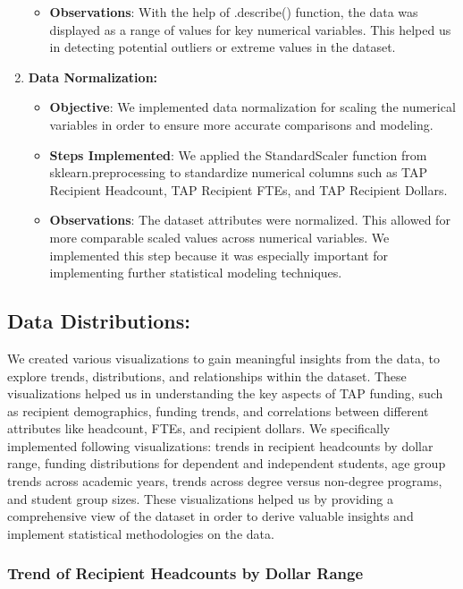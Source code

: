 \documentclass[sigconf]{acmart}
\begin{document}
\begin{enumerate}
\begin{itemize}
        \item \textbf{Observations}: With the help of .describe() function, the data was displayed as a range of values for key numerical variables. This helped us in detecting potential outliers or extreme values in the dataset.
    \end{itemize}
    \item \textbf{Data Normalization:}
    \begin{itemize}
        \item \textbf{Objective}: We implemented data normalization for scaling the numerical variables in order to ensure more accurate comparisons and modeling.
        \item \textbf{Steps Implemented}: We applied the StandardScaler function from sklearn.preprocessing to standardize numerical columns such as TAP Recipient Headcount, TAP Recipient FTEs, and TAP Recipient Dollars.
        \item \textbf{Observations}: The dataset attributes were normalized. This allowed for more comparable scaled values across numerical variables. We implemented this step because it was especially important for implementing further statistical modeling techniques.
    \end{itemize}
\end{enumerate}

\subsection{Data Distributions:}
We created various visualizations to gain meaningful insights from the data, to explore trends, distributions, and relationships within the dataset. These visualizations helped us in understanding the key aspects of TAP funding, such as recipient demographics, funding trends, and correlations between different attributes like headcount, FTEs, and recipient dollars. We specifically implemented following visualizations: trends in recipient headcounts by dollar range, funding distributions for dependent and independent students, age group trends across academic years, trends across degree versus non-degree programs, and student group sizes. These visualizations helped us by providing a comprehensive view of the dataset in order to derive valuable insights and implement statistical methodologies on the data.

\subsubsection{\textbf{Trend of Recipient Headcounts by Dollar Range}}
\end{document}
